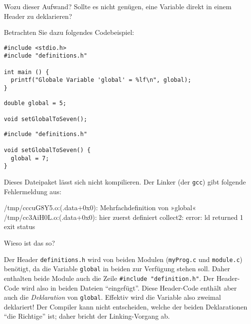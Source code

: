 Wozu dieser Aufwand? Sollte es nicht genügen, eine Variable direkt in einem Header zu deklarieren?

Betrachten Sie dazu folgendes Codebeispiel:
\begin{codebox}
\begin{verbatim}
#include <stdio.h>
#include "definitions.h"

int main () {
  printf("Globale Variable 'global' = %lf\n", global);
}
\end{verbatim}
\end{codebox}

\begin{codebox}
\begin{verbatim}
double global = 5;

void setGlobalToSeven();
\end{verbatim}
\end{codebox}

\begin{codebox}
\begin{verbatim}
#include "definitions.h"

void setGlobalToSeven() {
  global = 7;
}
\end{verbatim}
\end{codebox}

Dieses Dateipaket lässt sich nicht kompilieren. Der Linker (\ie der \texttt{gcc}) gibt folgende  Fehlermeldung aus:

\begin{cmdbox}
/tmp/cccuG8Y5.o:(.data+0x0): Mehrfachdefinition von »global«
/tmp/cc3AiH0L.o:(.data+0x0): hier zuerst definiert
collect2: error: ld returned 1 exit status
\end{cmdbox}

Wieso ist das so?

Der Header \texttt{definitions.h} wird von beiden Modulen (\texttt{myProg.c} und \texttt{module.c}) benötigt, da die Variable \texttt{global} in beiden zur Verfügung stehen soll. Daher enthalten beide Module auch die Zeile \texttt{#include "definition.h"}. Der Header-Code wird also in beiden Dateien \enquote{eingefügt}. Diese Header-Code enthält aber auch die \emph{Deklaration} von \texttt{global}. Effektiv wird die Variable also zweimal deklariert! Der Compiler kann nicht entscheiden, welche der beiden Deklarationen \enquote{die Richtige} ist; daher bricht der Linking-Vorgang ab.

